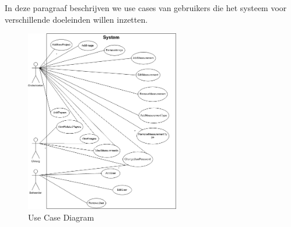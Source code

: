 In deze paragraaf beschrijven we use cases van gebruikers die het systeem voor verschillende doeleinden willen inzetten.
\begin{figure}[htp]
\begin{center}
	\includegraphics[width=0.6\textwidth]{UseCaseDiagram}
\caption{Use Case Diagram}
\label{fig:UseCaseDiagram}
\end{center}
\end{figure}


